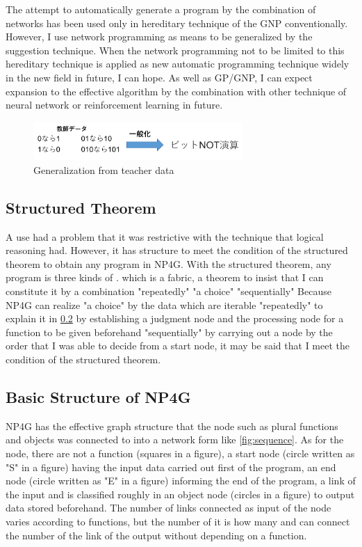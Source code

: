 \documentclass{article}
\begin{document}
The attempt to automatically generate a program by the combination of networks has been used only in hereditary technique of the GNP conventionally.
However, I use network programming as means to be generalized by the suggestion technique.
When the network programming not to be limited to this hereditary technique is applied as new automatic programming technique widely in the new field in future, I can hope.
As well as GP/GNP, I can expect expansion to the effective algorithm by the combination with other technique of neural network or reinforcement learning in future.

\begin{figure}[t]
\begin{center}
\includegraphics[width=80mm]{summary.png}
\end{center}
\caption {Generalization from teacher data}
\label{fig:summary}
\end{figure}

\subsection {Structured Theorem}
A use had a problem that it was restrictive with the technique that logical reasoning had.
However, it has structure to meet the condition of the structured theorem to obtain any program in NP4G.
With the structured theorem, any program is three kinds of \cite{StructuredProgramming}. which is a fabric, a theorem to insist that I can constitute it by a combination "repeatedly" "a choice" "sequentially"
Because NP4G can realize "a choice" by the data which are iterable "repeatedly" to explain it in \ref{sec:struct} by establishing a judgment node and the processing node for a function to be given beforehand "sequentially" by carrying out a node by the order that I was able to decide from a start node, it may be said that I meet the condition of the structured theorem.

\subsection{Basic Structure of NP4G}
\label{sec:struct}
NP4G has the effective graph structure that the node such as plural functions and objects was connected to into a network form like \ref{fig:sequence}.
As for the node, there are not a function (squares in a figure), a start node (circle written as "S" in a figure) having the input data carried out first of the program, an end node (circle written as "E" in a figure) informing the end of the program, a link of the input and is classified roughly in an object node (circles in a figure) to output data stored beforehand.
The number of links connected as input of the node varies according to functions, but the number of it is how many and can connect the number of the link of the output without depending on a function.
\end{document}
